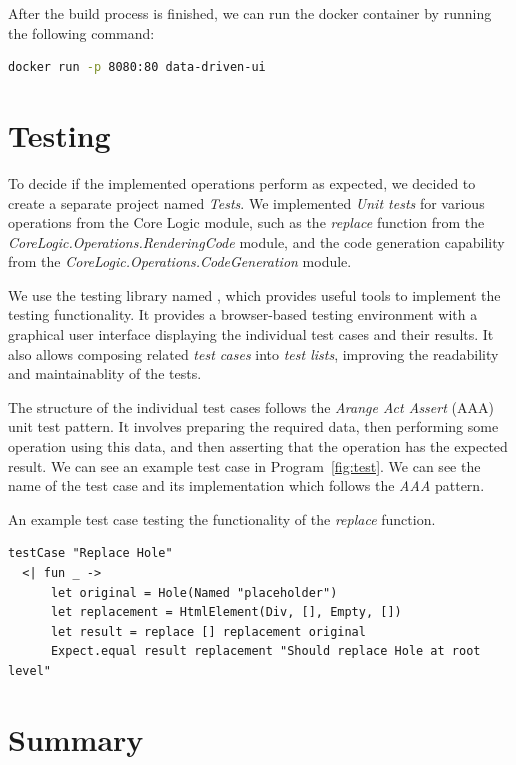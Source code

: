 After the build process is finished, we can run the docker container by running the following command:

\begin{lstlisting}[language=bash]
   docker run -p 8080:80 data-driven-ui  
\end{lstlisting}

\section{Testing}
\label{sec:testing}
To decide if the implemented operations perform as expected, we decided to create a separate project named \emph{Tests}.
We implemented \emph{Unit tests} for various operations from the Core Logic module, such as the \emph{replace} function from the \emph{CoreLogic.Operations.RenderingCode} module, and the code generation capability from the \emph{CoreLogic.Operations.CodeGeneration} module.

We use the testing library named \citet{mocha}, which provides useful tools to implement the testing functionality.
It provides a browser-based testing environment with a graphical user interface displaying the individual test cases and their results.
It also allows composing related \emph{test cases} into \emph{test lists}, improving the readability and maintainablity of the tests.

The structure of the individual test cases follows the \emph{Arange Act Assert} (AAA) unit test pattern.
It involves preparing the required data, then performing some operation using this data, and then asserting that the operation has the expected result.
We can see an example test case in Program~\ref{fig:test}.
We can see the name of the test case and its implementation which follows the \emph{AAA} pattern.

\begin{listing}[htbp]
	\caption{An example test case testing the functionality of the \emph{replace} function.}
	\label{fig:test}
	\begin{lstlisting}
testCase "Replace Hole"
  <| fun _ ->
      let original = Hole(Named "placeholder")
      let replacement = HtmlElement(Div, [], Empty, [])
      let result = replace [] replacement original
      Expect.equal result replacement "Should replace Hole at root level"
  \end{lstlisting}
\end{listing}


\section{Summary}

